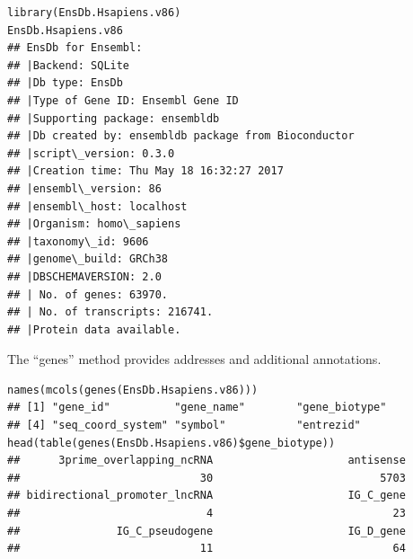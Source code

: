\documentclass[graybox]{svmult}
\begin{document}

\begin{shaded}
\begin{verbatim}
library(EnsDb.Hsapiens.v86)
EnsDb.Hsapiens.v86
## EnsDb for Ensembl:
## |Backend: SQLite
## |Db type: EnsDb
## |Type of Gene ID: Ensembl Gene ID
## |Supporting package: ensembldb
## |Db created by: ensembldb package from Bioconductor
## |script\_version: 0.3.0
## |Creation time: Thu May 18 16:32:27 2017
## |ensembl\_version: 86
## |ensembl\_host: localhost
## |Organism: homo\_sapiens
## |taxonomy\_id: 9606
## |genome\_build: GRCh38
## |DBSCHEMAVERSION: 2.0
## | No. of genes: 63970.
## | No. of transcripts: 216741.
## |Protein data available.
\end{verbatim}
\end{shaded}


The ``genes'' method provides addresses and additional
annotations.

\begin{shaded}
\begin{verbatim}
names(mcols(genes(EnsDb.Hsapiens.v86)))
## [1] "gene_id"          "gene_name"        "gene_biotype"     
## [4] "seq_coord_system" "symbol"           "entrezid"
head(table(genes(EnsDb.Hsapiens.v86)$gene_biotype))
##      3prime_overlapping_ncRNA                     antisense 
##                            30                          5703 
## bidirectional_promoter_lncRNA                     IG_C_gene 
##                             4                            23 
##               IG_C_pseudogene                     IG_D_gene 
##                            11                            64
\end{verbatim}
\end{shaded}
\end{document}
